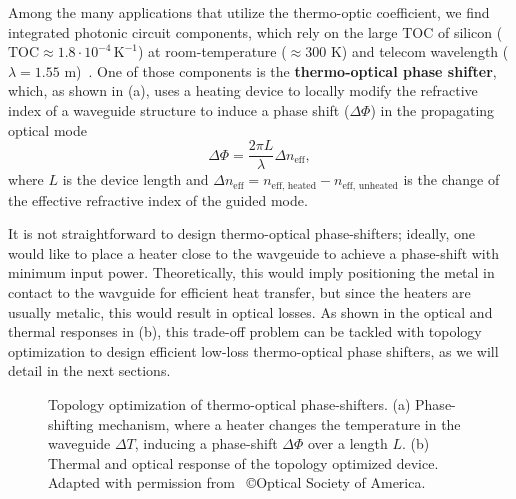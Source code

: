 Among the many applications that utilize the thermo-optic coefficient, we find integrated photonic circuit components, which rely on the large 
TOC of silicon ($\text{TOC} \approx 1.8 \cdot 10^{-4}\, \text{K}^{-1}$) at room-temperature ($\approx300$ K) and telecom wavelength 
($\lambda=1.55$ \textmu m)~\cite{thermo-optic-coef}. One of those components is the \textbf{thermo-optical phase shifter}, which, as shown in  (a),
uses a heating device to locally modify the refractive index of a waveguide structure to induce a phase shift ($\Delta \Phi$) in the propagating optical mode
\begin{equation*}
\Delta \Phi = \frac{2\pi L}{\lambda} \Delta n_\text{eff},
\end{equation*}
where $L$ is the device length and $\Delta n_\text{eff} = n_\text{eff, heated} - n_\text{eff, unheated}$
 is the change of the effective refractive index of the guided mode. 
 
 It is not straightforward to design thermo-optical phase-shifters; ideally, one would like to place a heater close to the wavgeuide to achieve a phase-shift with minimum input power.
 Theoretically, this would imply positioning the metal in contact to the wavguide for efficient heat transfer, but since the heaters are usually metalic, this would result
 in optical losses. As shown in the optical and thermal responses in  (b), this trade-off problem can be tackled with topology optimization to design efficient low-loss thermo-optical phase shifters, 
 as we will detail in the next sections.

\begin{figure}[tb]
    \centering
    \caption{Topology optimization of thermo-optical phase-shifters. (a) Phase-shifting mechanism, where a heater changes the temperature in the waveguide $\Delta T$, inducing a phase-shift
    $\Delta \Phi$ over a length $L$. (b) Thermal and optical response of the topology optimized device. Adapted with permission from~\cite{ownpub0} \copyright Optical Society of America.}
    \label{fig:thermo_res}
\end{figure}



